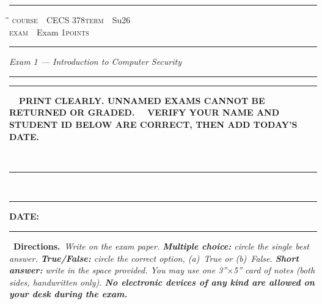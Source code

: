 \documentclass[11pt]{article}
\date{}
\makeatletter
\newif\ifanswers
\newcommand{\fieldline}[2]{%
  \rlap{\hspace{0.5em}\raisebox{2.2pt}{#2}}\rule[-3pt]{#1}{0.8pt}%
}
\newcommand{\identityinstruction}{%
  \ifx\studentname\@empty
    {\sffamily\bfseries\small\ding{43}~~PRINT CLEARLY. UNNAMED EXAMS CANNOT BE RETURNED OR GRADED.}%
  \else
    {\sffamily\bfseries\small\ding{43}~~VERIFY YOUR NAME AND STUDENT ID BELOW ARE CORRECT, THEN ADD TODAY'S DATE.}%
  \fi%
}
\newcommand{\doublerule}{%
  \noindent\rule{\linewidth}{1.0pt}\par\vspace{1.5pt}%
  \noindent\rule{\linewidth}{0.3pt}\par}
\newcommand{\metastrip}[4]{%
  \par\noindent\rule{\linewidth}{0.3pt}\par\vspace{2pt}%
  \noindent\begin{minipage}{\linewidth}%
  \begin{tabbing}%
  \hspace{6em}\=\hspace{16em}\=\hspace{6em}\=\kill%
  \textsc{course}~~\>#1\>\textsc{term}~~\>#2\\[1pt]%
  \textsc{exam}~~\>#3\>\textsc{points}~~\>#4%
  \end{tabbing}%
  \end{minipage}\par\vspace{-4pt}%
  \noindent\rule{\linewidth}{0.3pt}\par}
\makeatother
\begin{document}
\metastrip{CECS 378}{Su26}{Exam 1}{60}
\par\vspace{0.4em}
\begin{center}{\Large\itshape Exam 1 --- Introduction to Computer Security}\end{center}
\par\vspace{-0.2em}
\doublerule
\par\vspace{0.9em}

\par\vspace{6pt}
\noindent\identityinstruction
\par\vspace{12pt}

~\fieldline{13.5cm}{\large\studentname}
\par\vspace{14pt}
~\fieldline{5.5cm}{\large\ttfamily\studentid}\hfill{\sffamily\bfseries\large DATE:}~\rule[-3pt]{4cm}{0.8pt}
\par\vspace{6pt}

\ifanswers\par\vspace{0.4em}\noindent\colorbox{keyred}{\parbox{\dimexpr\textwidth-2\fboxsep\relax}{\centering\color{white}\sffamily\bfseries\large $\star$~~ANSWER KEY~~---~~NOT FOR DISTRIBUTION~~$\star$}}\par\vspace{0.4em}\fi

\par\vspace{0.6em}
\noindent{}~\textbf{Directions.}~\textit{Write on the exam paper. \textbf{Multiple choice:} circle the single best answer. \textbf{True/False:} circle the correct option, (a)~True or (b)~False. \textbf{Short answer:} write in the space provided. You may use one 3''$\times$5'' card of notes (both sides, handwritten only). \textbf{No electronic devices of any kind are allowed on your desk during the exam.}}
\par\vspace{0.4em}
\end{document}
